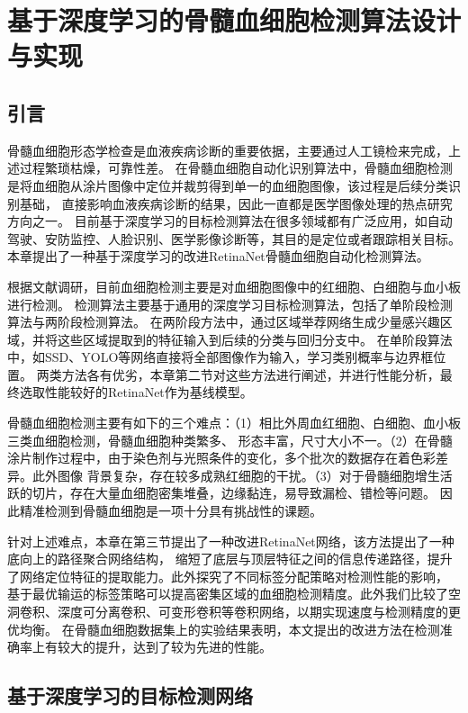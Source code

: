 
\chapter{基于深度学习的骨髓血细胞检测算法设计与实现}
\section{引言}
骨髓血细胞形态学检查是血液疾病诊断的重要依据，主要通过人工镜检来完成，上述过程繁琐枯燥，可靠性差。
在骨髓血细胞自动化识别算法中，骨髓血细胞检测是将血细胞从涂片图像中定位并裁剪得到单一的血细胞图像，该过程是后续分类识别基础，
直接影响血液疾病诊断的结果，因此一直都是医学图像处理的热点研究方向之一。
目前基于深度学习的目标检测算法在很多领域都有广泛应用，如自动驾驶、安防监控、人脸识别、医学影像诊断等，其目的是定位或者跟踪相关目标。
本章提出了一种基于深度学习的改进RetinaNet骨髓血细胞自动化检测算法。

根据文献调研，目前血细胞检测主要是对血细胞图像中的红细胞、白细胞与血小板进行检测。
检测算法主要基于通用的深度学习目标检测算法，包括了单阶段检测算法与两阶段检测算法。
在两阶段方法中，通过区域举荐网络生成少量感兴趣区域，并将这些区域提取到的特征输入到后续的分类与回归分支中。
在单阶段算法中，如SSD、YOLO等网络直接将全部图像作为输入，学习类别概率与边界框位置。
两类方法各有优劣，本章第二节对这些方法进行阐述，并进行性能分析，最终选取性能较好的RetinaNet作为基线模型。

骨髓血细胞检测主要有如下的三个难点：（1）相比外周血红细胞、白细胞、血小板三类血细胞检测，骨髓血细胞种类繁多、
形态丰富，尺寸大小不一。（2）在骨髓涂片制作过程中，由于染色剂与光照条件的变化，多个批次的数据存在着色彩差异。此外图像
背景复杂，存在较多成熟红细胞的干扰。（3）对于骨髓细胞增生活跃的切片，存在大量血细胞密集堆叠，边缘黏连，易导致漏检、错检等问题。
因此精准检测到骨髓血细胞是一项十分具有挑战性的课题。

针对上述难点，本章在第三节提出了一种改进RetinaNet网络，该方法提出了一种底向上的路径聚合网络结构，
缩短了底层与顶层特征之间的信息传递路径，提升了网络定位特征的提取能力。此外探究了不同标签分配策略对检测性能的影响，
基于最优输运的标签策略可以提高密集区域的血细胞检测精度。此外我们比较了空洞卷积、深度可分离卷积、可变形卷积等卷积网络，以期实现速度与检测精度的更优均衡。
在骨髓血细胞数据集上的实验结果表明，本文提出的改进方法在检测准确率上有较大的提升，达到了较为先进的性能。

\section{基于深度学习的目标检测网络}

